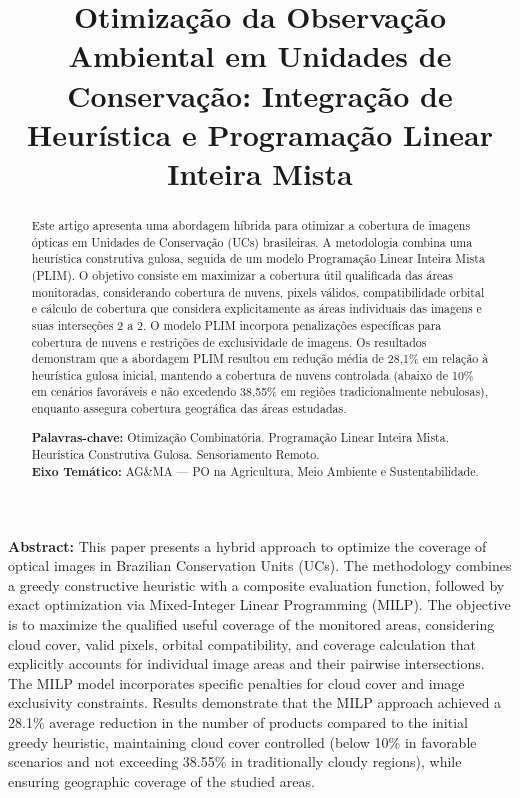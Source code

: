 \documentclass[a4paper,11pt]{article}
\title{\textbf{\Large Otimização da Observação Ambiental em Unidades de Conservação: Integração de Heurística e Programação Linear Inteira Mista}}
\date{}
\let\oldmaketitle\maketitle
\renewcommand{\maketitle}{%
  \oldmaketitle
  \thispagestyle{fancy}
}
\begin{document}
\maketitle
\vspace{-8mm}
\begin{abstract}
    Este artigo apresenta uma abordagem híbrida para otimizar a cobertura de imagens ópticas em Unidades de Conservação (UCs) brasileiras. A metodologia combina uma heurística construtiva gulosa, seguida de um modelo Programação Linear Inteira Mista (PLIM). O objetivo consiste em maximizar a cobertura útil qualificada das áreas monitoradas, considerando cobertura de nuvens, pixels válidos, compatibilidade orbital e cálculo de cobertura que considera explicitamente as áreas individuais das imagens e suas interseções $2$ a $2$. O modelo PLIM incorpora penalizações específicas para cobertura de nuvens e restrições de exclusividade de imagens. Os resultados demonstram que a abordagem PLIM resultou em redução média de 28,1\% em relação à heurística gulosa inicial, mantendo a cobertura de nuvens controlada (abaixo de 10\% em cenários favoráveis e não excedendo 38,55\% em regiões tradicionalmente nebulosas), enquanto assegura cobertura geográfica das áreas estudadas.

    \bigskip
    \noindent
    \textbf{Palavras-chave:} Otimização Combinatória. Programação Linear Inteira Mista. Heurística Construtiva Gulosa. Sensoriamento Remoto.\\
    \noindent\textbf{Eixo Temático:} AG\&MA --- PO na Agricultura, Meio Ambiente e Sustentabilidade.
    \end{abstract}
    
    \bigskip

    
    \bigskip
    
\noindent\textbf{Abstract:} 
    This paper presents a hybrid approach to optimize the coverage of optical images in Brazilian Conservation Units (UCs). The methodology combines a greedy constructive heuristic with a composite evaluation function, followed by exact optimization via Mixed-Integer Linear Programming (MILP). The objective is to maximize the qualified useful coverage of the monitored areas, considering cloud cover, valid pixels, orbital compatibility, and coverage calculation that explicitly accounts for individual image areas and their pairwise intersections. The MILP model incorporates specific penalties for cloud cover and image exclusivity constraints. Results demonstrate that the MILP approach achieved a 28.1\% average reduction in the number of products compared to the initial greedy heuristic, maintaining cloud cover controlled (below 10\% in favorable scenarios and not exceeding 38.55\% in traditionally cloudy regions), while ensuring geographic coverage of the studied areas.
\end{document}
